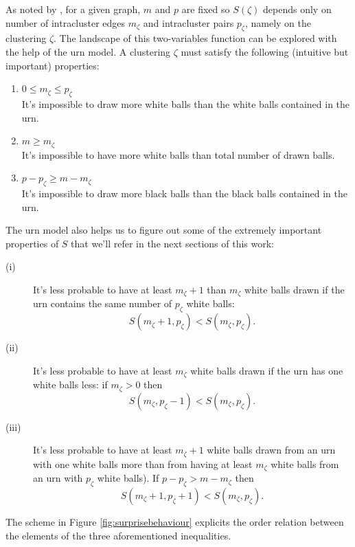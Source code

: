As noted by \cite{fleck2014}, for a given graph, $m$ and $p$ are fixed so $S(\zeta)$ depends only on number of intracluster edges $m_\zeta$ and intracluster pairs $p_\zeta$, namely on the clustering $\zeta$. The landscape of this two-variables function can be explored with the help of the urn model. A clustering $\zeta$ must satisfy the following (intuitive but important) properties:
\begin{enumerate}\label{list:urn_model_properties}
\item $0 \leq m_\zeta \leq p_\zeta$\\It's impossible to draw more white balls than the white balls contained in the urn.
\item $m\geq m_\zeta$\\It's impossible to have more white balls than total number of drawn balls.
\item $p-p_\zeta \geq m-m_\zeta$\\It's impossible to draw more black balls than the black balls contained in the urn.
\end{enumerate}
The urn model also helps us to figure out some of the extremely important properties of $S$ that we'll refer in the next sections of this work:
\begin{description}
\item[(i)]\label{list:surprise_properties} It's less probable to have at least $m_\zeta+1$ than $m_\zeta$ white balls drawn if the urn contains the same number of $p_\zeta$ white balls:
$$S(m_\zeta+1,p_\zeta) < S(m_\zeta,p_\zeta).$$
\item[(ii)] It's less probable to have at least $m_\zeta$ white balls drawn if the urn has one white balls less: if $m_\zeta >0$ then $$S(m_\zeta,p_\zeta-1) < S(m_\zeta,p_\zeta).$$
\item[(iii)] It's less probable to have at least $m_\zeta+1$ white balls drawn from an urn with one white balls more than from having at least $m_\zeta$ white balls from an urn with $p_\zeta$ white balls). If $p-p_\zeta> m-m_\zeta$ then $$S(m_\zeta+1,p_\zeta+1) < S(m_\zeta,p_\zeta).$$
\end{description}
The scheme in Figure \ref{fig:surprisebehaviour} explicits the order relation between the elements of the three aforementioned inequalities.
